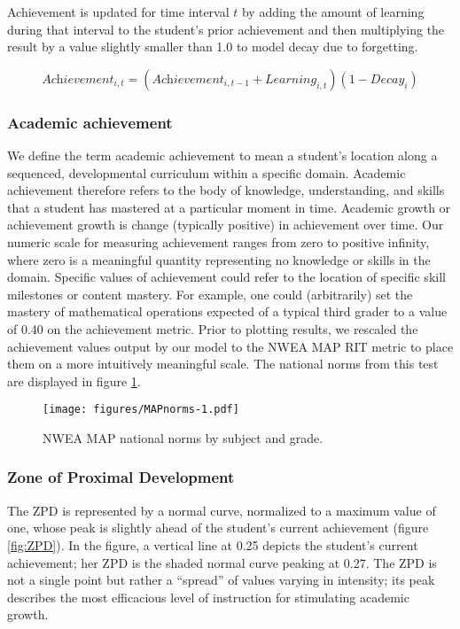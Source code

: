 \documentclass[english,floatsintext,jou]{apa6}
\theoremstyle{definition}
\theoremstyle{definition}
\theoremstyle{definition}
\theoremstyle{remark}
\begin{document}
Achievement is updated for time interval \(t\) by adding the amount of
learning during that interval to the student's prior achievement and
then multiplying the result by a value slightly smaller than 1.0 to
model decay due to forgetting.

\begin{equation}
\textit{Achievement}_{i,t}=(\textit{Achievement}_{i,t-1} + \textit{Learning}_{i,t})(1 - \textit{Decay}_i)
\end{equation}

\subsubsection{Academic achievement}\label{academic-achievement}

We define the term academic achievement to mean a student's location
along a sequenced, developmental curriculum within a specific domain.
Academic achievement therefore refers to the body of knowledge,
understanding, and skills that a student has mastered at a particular
moment in time. Academic growth or achievement growth is change
(typically positive) in achievement over time. Our numeric scale for
measuring achievement ranges from zero to positive infinity, where zero
is a meaningful quantity representing no knowledge or skills in the
domain. Specific values of achievement could refer to the location of
specific skill milestones or content mastery. For example, one could
(arbitrarily) set the mastery of mathematical operations expected of a
typical third grader to a value of 0.40 on the achievement metric. Prior
to plotting results, we rescaled the achievement values output by our
model to the NWEA MAP RIT metric to place them on a more intuitively
meaningful scale. The national norms from this test are displayed in
figure \ref{fig:MAPnorms}.

\begin{figure}[htbp]
\centering
\texttt{[image: figures/MAPnorms-1.pdf]}
\caption{\label{fig:MAPnorms}NWEA MAP national norms by subject and grade.}
\end{figure}

\subsubsection{Zone of Proximal
Development}\label{zone-of-proximal-development}

The ZPD is represented by a normal curve, normalized to a maximum value
of one, whose peak is slightly ahead of the student's current
achievement (figure \ref{fig:ZPD}). In the figure, a vertical line at
0.25 depicts the student's current achievement; her ZPD is the shaded
normal curve peaking at 0.27. The ZPD is not a single point but rather a
\enquote{spread} of values varying in intensity; its peak describes the
most efficacious level of instruction for stimulating academic growth.
\end{document}
